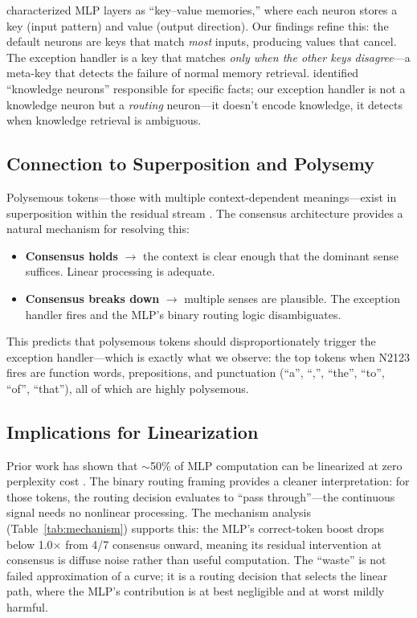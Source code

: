 \documentclass{article}
\begin{document}
\citet{geva2021transformer} characterized MLP layers as ``key--value memories,'' where each neuron
stores a key (input pattern) and value (output direction). Our findings refine this: the default
neurons are keys that match \emph{most} inputs, producing values that cancel. The exception handler
is a key that matches \emph{only when the other keys disagree}---a meta-key that detects the failure
of normal memory retrieval. \citet{dai2022knowledge} identified ``knowledge neurons'' responsible
for specific facts; our exception handler is not a knowledge neuron but a \emph{routing} neuron---it
doesn't encode knowledge, it detects when knowledge retrieval is ambiguous.

\subsection{Connection to Superposition and Polysemy}

Polysemous tokens---those with multiple context-dependent meanings---exist in superposition within
the residual stream \citep{elhage2022superposition}. The consensus architecture provides a natural
mechanism for resolving this:

\begin{itemize}[leftmargin=*]
\item \textbf{Consensus holds} $\to$ the context is clear enough that the dominant sense suffices.
  Linear processing is adequate.
\item \textbf{Consensus breaks down} $\to$ multiple senses are plausible. The exception handler
  fires and the MLP's binary routing logic disambiguates.
\end{itemize}

This predicts that polysemous tokens should disproportionately trigger the exception handler---which
is exactly what we observe: the top tokens when N2123 fires are function words, prepositions, and
punctuation (``a'', ``,'', ``the'', ``to'', ``of'', ``that''), all of which are highly polysemous.

\subsection{Implications for Linearization}

Prior work has shown that $\sim$50\% of MLP computation can be linearized at zero perplexity cost
\citep{balogh2026half}. The binary routing framing provides a cleaner interpretation: for those
tokens, the routing decision evaluates to ``pass through''---the continuous signal needs no
nonlinear processing. The mechanism analysis (Table~\ref{tab:mechanism}) supports this:
the MLP's correct-token boost drops below 1.0$\times$ from 4/7 consensus onward, meaning
its residual intervention at consensus is diffuse noise rather than useful computation.
The ``waste'' is not failed approximation of a curve; it is a routing
decision that selects the linear path, where the MLP's contribution is at best negligible
and at worst mildly harmful.
\end{document}

